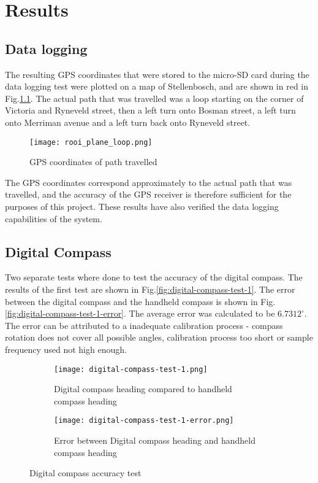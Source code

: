 \graphicspath{{results/fig/}}

\chapter{Results}

\section{Data logging}
The resulting GPS coordinates that were stored to the micro-SD card during the data logging test were plotted on a map of Stellenbosch, and are shown in red in Fig.\ref{fig:rooi-plane-loop}.
The actual path that was travelled was a loop starting on the corner of Victoria and Ryneveld street, then a left turn onto Bosman street, a left turn onto Merriman avenue and 
a left turn back onto Ryneveld street. 

\begin{figure}[!h]
    \centering
    \texttt{[image: rooi\_plane\_loop.png]}
    \caption[Data logging test]{GPS coordinates of path travelled}
    \label{fig:rooi-plane-loop}
\end{figure}

The GPS coordinates correspond approximately to the actual path that was travelled, and the accuracy of the GPS receiver is therefore sufficient for the purposes of this project. These results 
have also verified the data logging capabilities of the system. 

\section{Digital Compass}
Two separate tests where done to test the accuracy of the digital compass. The results of the first test are shown in Fig.\ref{fig:digital-compass-test-1}. The error between the digital compass
and the handheld compass is shown in Fig.\ref{fig:digital-compass-test-1-error}. The average error was calculated to be $6.7312^{\circ}$. The error can be attributed to a inadequate calibration
process - compass rotation does not cover all possible angles, calibration process too short or sample frequency used not high enough.

\begin{figure}[!h]
    \centering
    \begin{subfigure}[!h]{=0.9\linewidth}
        \centering
        \texttt{[image: digital-compass-test-1.png]}
        \caption{Digital compass heading compared to handheld compass heading}
        \label{subfig:digital-compass-test-1}
    \end{subfigure}

    \begin{subfigure}[!h]{=0.9\linewidth}
        \centering
        \texttt{[image: digital-compass-test-1-error.png]}
        \caption{Error between Digital compass heading and handheld compass heading}
        \label{subfig:digital-compass-test-1-error}
    \end{subfigure}
    \caption[Digital compass accuracy test-1]{Digital compass accuracy test}
    \label{fig:Digital compass accuracy test-1}
\end{figure}


